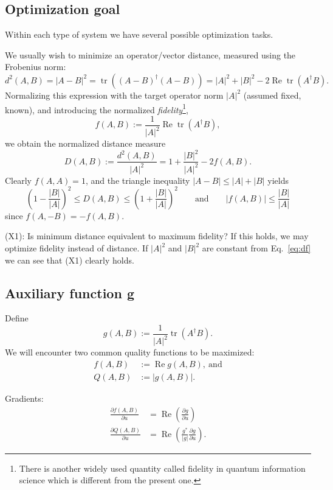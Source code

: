 \documentclass[aps, pra, a4paper, longbibliography]{revtex4}
\newcommand{\be}{\begin{equation}}
\newcommand{\ee}{\end{equation}}
\DeclareMathOperator{\tr}{tr}
\DeclareMathOperator{\re}{Re}
\newcommand{\dd}[2]{\frac{\partial #1}{\partial #2}}
\begin{document}
\subsection{Optimization goal}

Within each type of system we have several possible optimization
tasks.



We usually wish to minimize an operator/vector distance, measured using the Frobenius norm:
\be
d^2(A, B) = |A-B|^2 = \tr((A-B)^\dagger (A-B))
= |A|^2 +|B|^2 -2 \re \tr(A^\dagger B).
\ee
Normalizing this expression with the target operator norm $|A|^2$ (assumed fixed, known),
and introducing the normalized \emph{fidelity}\footnote{
There is another widely used quantity called fidelity in quantum information science which is different from the present one.},
\be
f(A, B) := \frac{1}{|A|^2} \re \tr(A^\dagger B),
\ee
we obtain the normalized distance measure
\be
\label{eq:df}
D(A,B)
:= \frac{d^2(A, B)}{|A|^2}
= 1 +\frac{|B|^2}{|A|^2} -2 f(A, B).
\ee
Clearly $f(A, A) = 1$, and
the triangle inequality $|A-B| \le |A|+|B|$ yields
\be
\left(1 -\frac{|B|}{|A|} \right)^2 \le D(A, B) \le \left(1 +\frac{|B|}{|A|} \right)^2
\qquad \text{and} \qquad
|f(A, B)|
\le \frac{|B|}{|A|}
\ee
since $f(A, -B) = -f(A, B)$.


(X1): Is minimum distance equivalent to maximum fidelity?
If this holds, we may optimize fidelity instead of distance.
If $|A|^2$ and $|B|^2$ are constant
from Eq.~\eqref{eq:df} we can see that (X1) clearly holds.



\subsection{Auxiliary function g}

Define
\be
g(A, B) := \frac{1}{|A|^2} \tr(A^\dagger B).
\ee
We will encounter two common quality functions to be maximized:
\begin{align}
f(A,B) &:= \re g(A,B), \: \text{and}\\
Q(A,B) &:= |g(A,B)|.
\end{align}

Gradients:
\begin{align}
\dd{f(A,B)}{u}
&= \re \left( \dd{g}{u} \right) \\
\dd{Q(A,B)}{u}
&= \re \left(\frac{g^*}{|g|} \dd{g}{u} \right).
\end{align}
\end{document}
